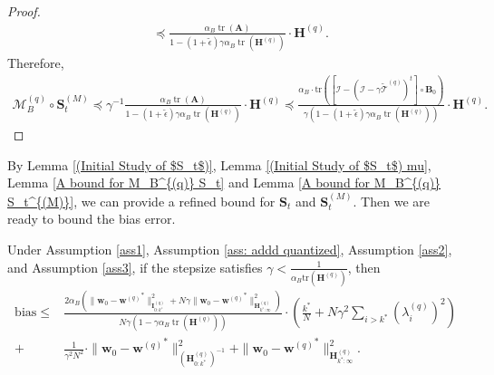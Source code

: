 \documentclass[11pt, letterpaper]{article}
\begin{document}
\begin{proof}
\begin{equation*}
\begin{aligned}
            &\preceq\frac{\alpha_B\operatorname{tr}(\mathbf{A})}{1-(1+\tilde{\epsilon})\gamma\alpha_B\operatorname{tr}(\mathbf{H}^{(q)})}\cdot\mathbf{H}^{(q)}.
        \end{aligned}
    \end{equation*}
    Therefore,
    \begin{equation*}
        \begin{aligned}
            \mathcal{M}_B^{(q)} \circ \mathbf{S}_t^{(M)} \preceq \gamma^{-1}\frac{\alpha_B\operatorname{tr}(\mathbf{A})}{1-(1+\tilde{\epsilon})\gamma\alpha_B\operatorname{tr}(\mathbf{H}^{(q)})}\cdot\mathbf{H}^{(q)}\preceq \frac{\alpha_B\cdot\mathrm{tr}\left(\left[\mathcal{I}-(\mathcal{I}-\gamma\widetilde{\mathcal{T}}^{(q)})^t\right]\circ\mathbf{B}_0\right)}{\gamma(1-(1+\tilde{\epsilon})\gamma\alpha_B\operatorname{tr}(\mathbf{H}^{(q)}))}\cdot\mathbf{H}^{(q)}.
        \end{aligned}
    \end{equation*}
\end{proof}

By Lemma \ref{(Initial Study of $S_t$)}, Lemma \ref{(Initial Study of $S_t$) mu}, Lemma \ref{A bound for M_B^{(q)} S_t} and Lemma \ref{A bound for M_B^{(q)} S_t^{(M)}}, we can provide a refined bound for $\mathbf{S}_t$ and $\mathbf{S}_t^{(M)}$. Then we are ready to bound the bias error.

\begin{lemma}
    \label{bias R2 bound}
    Under Assumption \ref{ass1}, Assumption \ref{ass: addd quantized}, Assumption \ref{ass2}, and Assumption \ref{ass3}, if the stepsize satisfies $\gamma < \frac{1}{\alpha_B\mathrm{tr}(\mathbf{H}^{(q)})}$, then
    \begin{equation*}
        \begin{aligned}
            \mathrm{bias}
            \leq & \frac{2\alpha_B\left(\|\mathbf{w}_0-{\mathbf{w}^{(q)}}^*\|_{\mathbf{I}_{0:k^*}^{(q)}}^2+N\gamma\|\mathbf{w}_0-{\mathbf{w}^{(q)}}^*\|_{\mathbf{H}_{k^*:\infty}^{(q)}}^2\right)}{N\gamma(1-\gamma\alpha_B\operatorname{tr}(\mathbf{H}^{(q)}))}\cdot\left(\frac{k^*}{N}+N\gamma^2\sum_{i>k^*}(\lambda_i^{(q)})^2\right)\\
            +& \frac{1}{\gamma^2N^2}\cdot\|\mathbf{w}_0-{\mathbf{w}^{(q)}}^*\|_{(\mathbf{H}_{0:k^*}^{(q)})^{-1}}^2+\|\mathbf{w}_0-{\mathbf{w}^{(q)}}^*\|_{\mathbf{H}_{k^*:\infty}^{(q)}}^2.
        \end{aligned}
    \end{equation*}
\end{lemma}
\end{document}
